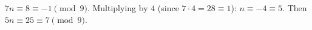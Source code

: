 $7n\equiv8\equiv-1\pmod9$. Multiplying by $4$ (since $7\cdot4=28\equiv1$): $n\equiv-4\equiv5$. Then $5n\equiv25\equiv\boxed{7}\pmod9$.

